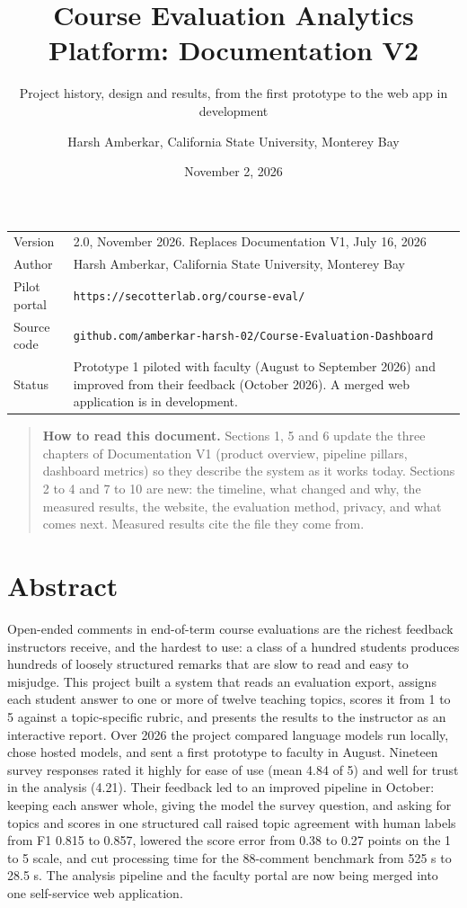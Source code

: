 \documentclass[
  11pt,
]{article}
\title{Course Evaluation Analytics Platform: Documentation V2}
\subtitle{Project history, design and results, from the first prototype to the
web app in development}
\author{Harsh Amberkar, California State University, Monterey Bay}
\date{November 2, 2026}
\newcounter{none} %
\begin{document}
\maketitle

{
\hypersetup{linkcolor=black}
\setcounter{tocdepth}{3}
\tableofcontents
}
{\def\LTcaptype{none} %
\begin{longtable}[]{@{}ll@{}}
\toprule\noalign{}
& \\
\midrule\noalign{}
\endhead
\bottomrule\noalign{}
\endlastfoot
Version & 2.0, November 2026. Replaces Documentation V1, July 16, 2026 \\
Author & Harsh Amberkar, California State University, Monterey Bay \\
Pilot portal & \texttt{https://secotterlab.org/course-eval/} \\
Source code &
\texttt{github.com/amberkar-harsh-02/Course-Evaluation-Dashboard} \\
Status & Prototype 1 piloted with faculty (August to September 2026) and
improved from their feedback (October 2026). A merged web application is in
development. \\
\end{longtable}
}

\begin{quote}
\textbf{How to read this document.} Sections 1, 5 and 6 update the three
chapters of Documentation V1 (product overview, pipeline pillars, dashboard
metrics) so they describe the system as it works today. Sections 2 to 4 and 7 to
10 are new: the timeline, what changed and why, the measured results, the
website, the evaluation method, privacy, and what comes next. Measured results
cite the file they come from.
\end{quote}

\section{Abstract}\label{abstract}

Open-ended comments in end-of-term course evaluations are the richest feedback
instructors receive, and the hardest to use: a class of a hundred students
produces hundreds of loosely structured remarks that are slow to read and easy
to misjudge. This project built a system that reads an evaluation export,
assigns each student answer to one or more of twelve teaching topics, scores it
from 1 to 5 against a topic-specific rubric, and presents the results to the
instructor as an interactive report. Over 2026 the project compared language
models run locally, chose hosted models, and sent a first prototype to faculty
in August. Nineteen survey responses rated it highly for ease of use (mean 4.84
of 5) and well for trust in the analysis (4.21). Their feedback led to an
improved pipeline in October: keeping each answer whole, giving the model the
survey question, and asking for topics and scores in one structured call raised
topic agreement with human labels from F1 0.815 to 0.857, lowered the score
error from 0.38 to 0.27 points on the 1 to 5 scale, and cut processing time for
the 88-comment benchmark from 525 s to 28.5 s. The analysis pipeline and the
faculty portal are now being merged into one self-service web application.
\end{document}
